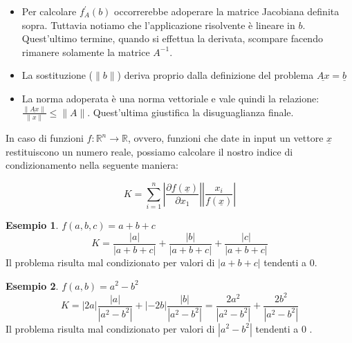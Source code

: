 \documentclass[12pt, a4paper]{book}
\theoremstyle{definition}
\newtheorem{exmp}{Esempio}[section]
\newcommand{\VarMtrx}[1]{\ensuremath{\underline{#1}}}
\begin{document}
\begin{flushleft}
\begin{itemize}
	\item Per calcolare $f^{'}_{A}(b)$ occorrerebbe adoperare la matrice Jacobiana definita sopra. Tuttavia notiamo che l'applicazione risolvente è lineare in $b$. Quest'ultimo termine, quando si effettua la derivata, scompare facendo rimanere solamente la matrice $A^{-1}$. 
	\item La sostituzione ($\lVert b \rVert$) deriva proprio dalla definizione del problema $\VarMtrx{Ax} = \VarMtrx{b}$
	\item La norma adoperata è una norma vettoriale e vale quindi la relazione: $\frac{\lVert \VarMtrx{Ax} \rVert}{ \lVert x \rVert} \leq \lVert A \rVert$. Quest'ultima giustifica la disuguaglianza finale. 
\end{itemize}

In caso di funzioni $f: \mathbb{R}^{n} \rightarrow \mathbb{R}$, ovvero,  funzioni che date in input un vettore $\VarMtrx{x}$ restituiscono un numero reale, possiamo calcolare il nostro indice di condizionamento nella seguente maniera: 

\[ 
	K = \sum_{i = 1}^{n} 
				\displaystyle\left\lvert 
					\dfrac{\partial f(\VarMtrx{x})}{\partial x_{1}}  
				\right\rvert 
				\displaystyle\left\lvert
					\dfrac{x_{i}}{f(\VarMtrx{x})}
				\right\rvert 
\]

\begin{exmp}
$f(a,b,c) = a+b+c$
\[ 	
	K = \frac{|a|}{|a+b+c|} + \frac{|b|}{|a+b+c|}  + \frac{|c|}{|a+b+c|}
\]
Il problema risulta mal condizionato per valori di $|a+b+c|$ tendenti a 0.
\end{exmp}

\begin{exmp}
$f(a,b) = a^{2}-b^{2}$
\[ 	
	K = |2a| \frac{|a|}{|a^{2}-b^{2}|} + |-2b| \frac{|b|}{|a^{2}-b^{2}|} =  \frac{2a^{2}}{|a^{2}-b^{2}|} + \frac{2b^{2}}{|a^{2}-b^{2}|} 
\]
Il problema risulta mal condizionato per valori di $|a^{2}-b^{2}|$ tendenti a 0 .
\end{exmp}
\end{flushleft}
\end{document}

